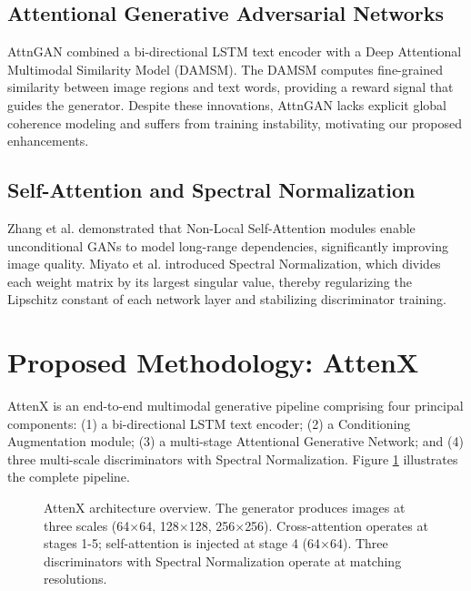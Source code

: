 \documentclass[conference]{IEEEtran}
\begin{document}
\subsection{Attentional Generative Adversarial Networks}
AttnGAN \cite{xu2018attngan} combined a bi-directional LSTM text encoder with a Deep Attentional Multimodal Similarity Model (DAMSM). The DAMSM computes fine-grained similarity between image regions and text words, providing a reward signal that guides the generator. Despite these innovations, AttnGAN lacks explicit global coherence modeling and suffers from training instability, motivating our proposed enhancements.

\subsection{Self-Attention and Spectral Normalization}
Zhang et al. \cite{zhang2019self} demonstrated that Non-Local Self-Attention modules enable unconditional GANs to model long-range dependencies, significantly improving image quality. Miyato et al. \cite{miyato2018spectral} introduced Spectral Normalization, which divides each weight matrix by its largest singular value, thereby regularizing the Lipschitz constant of each network layer and stabilizing discriminator training.

\section{Proposed Methodology: AttenX}
\label{sec:method}

AttenX is an end-to-end multimodal generative pipeline comprising four principal components: (1) a bi-directional LSTM text encoder; (2) a Conditioning Augmentation module; (3) a multi-stage Attentional Generative Network; and (4) three multi-scale discriminators with Spectral Normalization. Figure \ref{fig:architecture} illustrates the complete pipeline.

\begin{figure}[htbp]
\centering
{}
\caption{AttenX architecture overview. The generator produces images at three scales (64$\times$64, 128$\times$128, 256$\times$256). Cross-attention operates at stages 1-5; self-attention is injected at stage 4 (64$\times$64). Three discriminators with Spectral Normalization operate at matching resolutions.}
\label{fig:architecture}
\end{figure}
\end{document}
